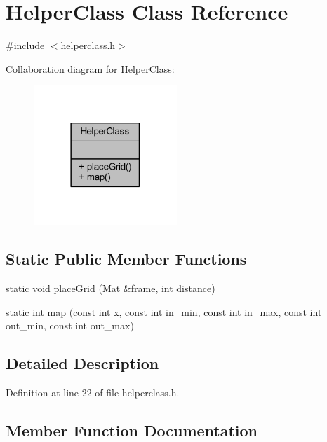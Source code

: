 \hypertarget{classHelperClass}{}\section{Helper\+Class Class Reference}
\label{classHelperClass}


{\ttfamily \#include $<$helperclass.\+h$>$}



Collaboration diagram for Helper\+Class\+:
\nopagebreak
\begin{figure}[H]
\begin{center}
\leavevmode
\includegraphics[width=153pt]{classHelperClass__coll__graph}
\end{center}
\end{figure}
\subsection*{Static Public Member Functions}
\begin{DoxyCompactItemize}
\item 
static void \mbox{\hyperlink{classHelperClass_a2628c0f86fb5959325f6aa4272b6f210}{place\+Grid}} (Mat \&frame, int distance)
\item 
static int \mbox{\hyperlink{classHelperClass_a527b26e649e561032d957ce26beb922e}{map}} (const int x, const int in\+\_\+min, const int in\+\_\+max, const int out\+\_\+min, const int out\+\_\+max)
\end{DoxyCompactItemize}


\subsection{Detailed Description}


Definition at line 22 of file helperclass.\+h.



\subsection{Member Function Documentation}
\mbox{\label{classHelperClass_a527b26e649e561032d957ce26beb922e}} 
